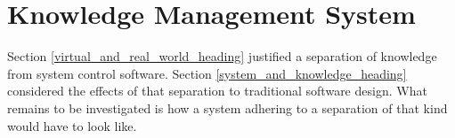 %
%
%
%
%
%
%

\section{Knowledge Management System}
\label{knowledge_management_system_heading}

Section \ref{virtual_and_real_world_heading} justified a separation of knowledge
from system control software. Section \ref{system_and_knowledge_heading}
considered the effects of that separation to traditional software design. What
remains to be investigated is how a system adhering to a separation of that
kind would have to look like.





